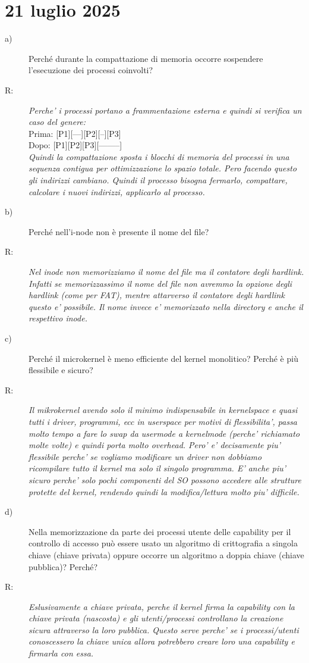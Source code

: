\documentclass[a4paper,12pt]{article}
\newcommand{\datasection}[1]{%
    \section*{#1}%
    \addcontentsline{toc}{section}{#1}%
}
\newenvironment{exambox}{%
    \begin{mdframed}[
        linecolor=black!70,
        linewidth=0.6pt,
        innerleftmargin=8pt,
        innerrightmargin=8pt,
        innertopmargin=6pt,
        innerbottommargin=6pt
    ]
    \begin{description}
}{%
    \end{description}
    \end{mdframed}
}
\begin{document}
\newpage
\datasection{21 luglio 2025}
\begin{exambox}
\item[a)] Perché durante la compattazione di memoria occorre sospendere l'esecuzione dei processi coinvolti?
\item[R:] \textit{Perche' i processi portano a frammentazione esterna e quindi si verifica un caso del genere:}\\
Prima:  [P1][---][P2][--][P3]\\
Dopo:   [P1][P2][P3][--------]\\
\textit{Quindi la compattazione sposta i blocchi di memoria del processi in una sequenza contigua per ottimizzazione lo spazio totale. Pero facendo questo gli indirizzi cambiano. Quindi il processo bisogna fermarlo, compattare, calcolare i nuovi indirizzi, applicarlo al processo.}
\item[b)] Perché nell'i-node non è presente il nome del file?
\item[R:] \textit{Nel inode non memorizziamo il nome del file ma il contatore degli hardlink. Infatti se memorizzassimo il nome del file non avremmo la opzione degli hardlink (come per FAT), mentre attarverso il contatore degli hardlink questo e' possibile. Il nome invece e' memorizzato nella directory e anche il respettivo inode.}
\item[c)] Perché il microkernel è meno efficiente del kernel monolitico? Perché è più flessibile e sicuro?
\item[R:] \textit{Il mikrokernel avendo solo il minimo indispensabile in kernelspace e quasi tutti i driver, programmi, ecc in userspace per motivi di flessibilita', passa molto tempo a fare lo swap da usermode a kernelmode (perche' richiamato molte volte) e quindi porta molto overhead. Pero' e' decisamente piu' flessibile perche' se vogliamo modificare un driver non dobbiamo ricompilare tutto il kernel ma solo il singolo programma. E' anche piu' sicuro perche' solo pochi componenti del SO possono accedere alle strutture protette del kernel, rendendo quindi la modifica/lettura molto piu' difficile.}
\item[d)] Nella memorizzazione da parte dei processi utente delle capability per il controllo di accesso può essere usato un algoritmo di crittografia a singola chiave (chiave privata) oppure occorre un algoritmo a doppia chiave (chiave pubblica)? Perché?
\item[R:] \textit{Eslusivamente a chiave privata, perche il kernel firma la capability con la chiave privata (nascosta) e gli utenti/processi controllano la creazione sicura attraverso la loro pubblica. Questo serve perche' se i processi/utenti conoscessero la chiave unica allora potrebbero creare loro una capability e firmarla con essa.}
\end{exambox}
\end{document}
